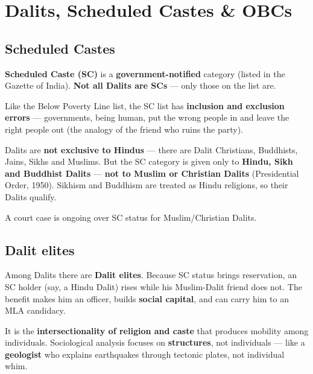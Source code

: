 \section{Dalits, Scheduled Castes \& OBCs}

\subsection{Scheduled Castes}

\textbf{Scheduled Caste (SC)} is a \textbf{government-notified} category (listed in the Gazette of India). \textbf{Not all Dalits are SCs} --- only those on the list are.

\begin{ExampleBox}
Like the Below Poverty Line list, the SC list has \textbf{inclusion and exclusion errors} --- governments, being human, put the wrong people in and leave the right people out (the analogy of the friend who ruins the party).
\end{ExampleBox}

\begin{DataFact}
Dalits are \textbf{not exclusive to Hindus} --- there are Dalit Christians, Buddhists, Jains, Sikhs and Muslims. But the SC category is given only to \textbf{Hindu, Sikh and Buddhist Dalits} --- \textbf{not to Muslim or Christian Dalits} (Presidential Order, 1950). Sikhism and Buddhism are treated as Hindu religions, so their Dalits qualify.
\end{DataFact}

A court case is ongoing over SC status for Muslim/Christian Dalits.

\subsection{Dalit elites}

Among Dalits there are \textbf{Dalit elites}. Because SC status brings reservation, an SC holder (say, a Hindu Dalit) rises while his Muslim-Dalit friend does not. The benefit makes him an officer, builds \textbf{social capital}, and can carry him to an MLA candidacy.

\begin{KeyConcept}
It is the \textbf{intersectionality of religion and caste} that produces mobility among individuals. Sociological analysis focuses on \textbf{structures}, not individuals --- like a \textbf{geologist} who explains earthquakes through tectonic plates, not individual whim.
\end{KeyConcept}


